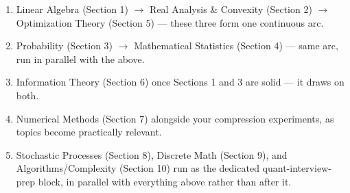 \documentclass[11pt]{article}
\begin{document}
\begin{enumerate}[leftmargin=1.6em]
    \item Linear Algebra (Section 1) $\to$ Real Analysis \& Convexity (Section 2) $\to$ Optimization Theory (Section 5) — these three form one continuous arc.
    \item Probability (Section 3) $\to$ Mathematical Statistics (Section 4) — same arc, run in parallel with the above.
    \item Information Theory (Section 6) once Sections 1 and 3 are solid — it draws on both.
    \item Numerical Methods (Section 7) alongside your compression experiments, as topics become practically relevant.
    \item Stochastic Processes (Section 8), Discrete Math (Section 9), and Algorithms/Complexity (Section 10) run as the dedicated quant-interview-prep block, in parallel with everything above rather than after it.
\end{enumerate}
\end{document}
